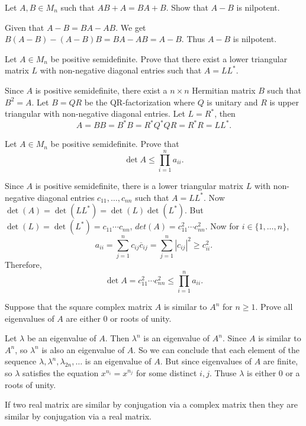 \question Let $A,B\in M_n$ such that $AB+A=BA+B$. Show that $A-B$ is nilpotent.
\begin{solution}
    Given that $A-B=BA-AB$. We get $B(A-B)-(A-B)B=BA-AB=A-B$. Thus $A-B$ is nilpotent.
\end{solution}

\question Let $A\in M_n$ be positive semidefinite. Prove that there exist a lower triangular matrix $L$ with non-negative diagonal entries such that $A=LL^*$.

\begin{solution}
    Since $A$ is positive semidefinite, there exist a $n\times n$ Hermitian matrix $B$ such that $B^2=A$. Let $B=QR$ be the QR-factorization where $Q$ is unitary and $R$ is upper triangular with non-negative diagonal entries. Let $L=R^*$, then 
    $$A=BB=B^*B=R^*Q^*QR=R^*R=LL^*.$$
\end{solution}

\question Let $A\in M_n$ be positive semidefinite. Prove that $$\det{A}\leq\prod_{i=1}^{n}{a_{ii}}.$$

\begin{solution}
    Since $A$ is positive semidefinite, there is a lower triangular matrix $L$ with non-negative diagonal entries $c_{11}, \ldots, c_{nn}$ such that $A=LL^*$. Now $\det(A)=\det(LL^*)=\det(L)\det(L^*)$. But $\det(L)=\det(L^*)=c_{11}\cdots c_{nn}$, $det(A)=c^2_{11}\cdots c^2_{nn}$. Now for $i\in\{1,\ldots, n\}$,
    $$a_{ii}=\sum_{j=1}^{n}{c_{ij}\overline{c}_{ij}}=\sum_{j=1}^{n}{|c_{ij}|^2}\geq c^2_{ii}.$$
    Therefore,
    $$\det{A}=c^2_{11}\cdots c^2_{nn}\leq\prod_{i=1}^{n}{a_{ii}}.$$
\end{solution}

\question Suppose that the square complex matrix $A$ is similar to $A^n$ for $n\geq 1$. Prove all eigenvalues of $A$ are either 0 or roots of unity.

\begin{solution}
    Let $\lambda$ be an eigenvalue of $A$. Then $\lambda^n$ is an eigenvalue of $A^n$. Since $A$ is similar to $A^n$, so $\lambda^n$ is also an eigenvalue of $A$. So we can conclude that each element of the sequence $\lambda, \lambda^n, \lambda_{2n}, \ldots $ is an eigenvalue of $A$. But since eigenvalues of $A$ are finite, so $\lambda$ satisfies the equation $x^{n_i}=x^{n_j}$ for some distinct $i,j$. Thuse $\lambda$ is either 0 or a roots of unity.
\end{solution}
\question If two real matrix are similar by conjugation via a complex matrix then they are similar by conjugation via a real matrix.

